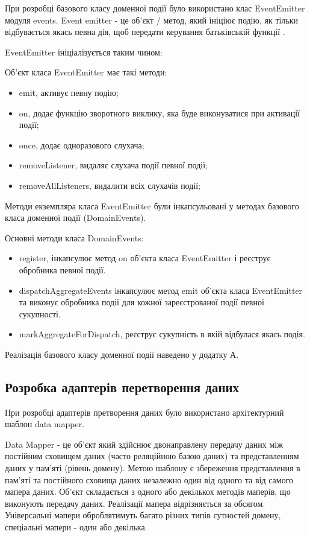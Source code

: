 При розробці базового класу доменної події було використано клас EventEmitter модуля events.
Event emitter - це об'єкт / метод, який ініціює подію, як тільки відбувається якась певна дія,
щоб передати керування батьківській функції \cite{event-emitter-doc}.

EventEmitter ініціалізується таким чином:


Об'єкт класа EventEmitter має такі методи:

\begin{itemize}
    \item emit, активує певну подію;
    \item on, додає функцію зворотного виклику,
        яка буде виконуватися при активації події;
    \item once, додає одноразового слухача;
    \item removeListener, видаляє слухача події певної події;
    \item removeAllListeners, видалити всіх слухачів події;
\end{itemize}

Методи екземпляра класа EventEmitter були інкапсульовані 
у методах базового класа доменної події (DomainEvents).

Основні методи класа DomainEvents:

\begin{itemize}
    \item register, інкапсулює метод on об'єкта 
      класа EventEmitter і реєструє обробника певної події.
    \item dispatchAggregateEvents інкапсулює метод emit об'єкта
      класа EventEmitter та виконує обробника події для кожної
      зареєстрованої події певної сукупності.
    \item markAggregateForDispatch, реєструє сукупність в якій
      відбулася якась подія.
\end{itemize}

Реалізація базового класу доменної події наведено у додатку А.

\subsection{Розробка адаптерів перетворення даних}

При розробці адаптерів претворення даних було використано 
архітектурний шаблон data mapper.

Data Mapper - це об'єкт який здійснює двонаправлену передачу даних між
постійним сховищем даних (часто реляційною базою даних)
та представленням даних у пам'яті (рівень домену).
Метою шаблону є збереження представлення в
пам'яті та постійного сховища даних незалежно один
від одного та від самого мапера даних.
Об'єкт складається з одного або декількох методів маперів,
що виконують передачу даних. Реалізації мапера відрізняється
за обсягом. Універсальні мапери оброблятимуть
багато різних типів сутностей домену,
спеціальні мапери - один або декілька.

